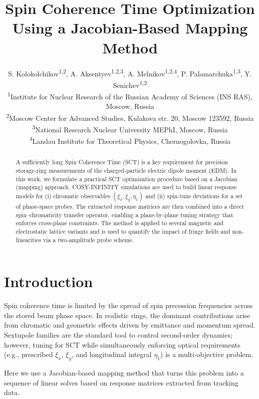 \documentclass[a4paper,
               keeplastbox,   %
               ]{jacow}
\begin{document}
\title{Spin Coherence Time Optimization Using a Jacobian-Based Mapping Method}

\author{S. Kolokolchikov\textsuperscript{1,2}, A. Aksentyev\textsuperscript{1,2,3}, A. Melnikov\textsuperscript{1,2,4}, P. Palamarchuka\textsuperscript{1,3}, Y. Senichev\textsuperscript{1,2} \\
\textsuperscript{1}Institute for Nuclear Research of the Russian Academy of Sciences (INS RAS), Moscow, Russia\\
\textsuperscript{2}Moscow Center for Advanced Studies, Kulakova str. 20, Moscow 123592, Russia\\
\textsuperscript{3}National Research Nuclear University MEPhI, Moscow, Russia\\
\textsuperscript{4}Landau Institute for Theoretical Physics, Chernogolovka, Russia\\}
	
\maketitle

%
\begin{abstract}

	\par A sufficiently long Spin Coherence Time (SCT) is a key requirement for precision storage-ring measurements of the charged-particle electric dipole moment (EDM). In this work, we formulate a practical SCT optimization procedure based on a Jacobian (mapping) approach. COSY-INFINITY simulations are used to build linear response models for (i) chromatic observables \((\xi_x,\xi_y,\eta_1)\) and (ii) spin-tune deviations for a set of phase-space probes. The extracted response matrices are then combined into a direct spin--chromaticity transfer operator, enabling a plane-by-plane tuning strategy that enforces cross-plane constraints. The method is applied to several magnetic and electrostatic lattice variants and is used to quantify the impact of fringe fields and non-linearities via a two-amplitude probe scheme.

\end{abstract}

\section{Introduction}
\par Spin coherence time is limited by the spread of spin precession frequencies across the stored beam phase space. In realistic rings, the dominant contributions arise from chromatic and geometric effects driven by emittance and momentum spread. Sextupole families are the standard tool to control second-order dynamics; however, tuning for SCT while simultaneously enforcing optical requirements (e.g., prescribed \(\xi_x\), \(\xi_y\), and longitudinal integral \(\eta_1\)) is a multi-objective problem.
\par Here we use a Jacobian-based mapping method that turns this problem into a sequence of linear solves based on response matrices extracted from tracking data.
\end{document}
